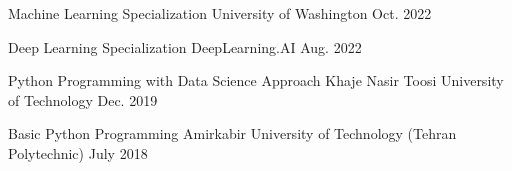 \begin{cvhonors}

  \cvhonor
    {Machine Learning Specialization} %
    {University of Washington} %
    {} %
    {Oct. 2022} %

  \cvhonor
    {Deep Learning Specialization} %
    {DeepLearning.AI} %
    {} %
    {Aug. 2022} %
    
  \cvhonor
    {Python Programming with Data Science Approach} %
    {Khaje Nasir Toosi University of Technology} %
    {} %
    {Dec. 2019} %

  \cvhonor
    {Basic Python Programming} %
    {Amirkabir University of Technology (Tehran Polytechnic)} %
    {} %
    {July 2018} %

\end{cvhonors}
